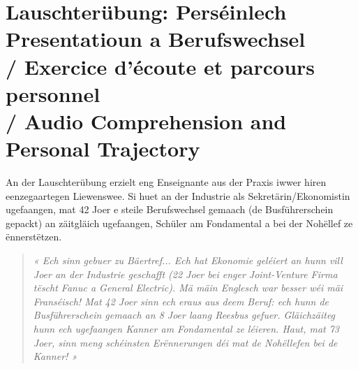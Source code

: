 \vspace{1.5em}

\section[Lauschterübung \& Presentatioun / Audio Comprehension \& Presentation]{Lauschterübung: Perséinlech Presentatioun a Berufswechsel \\/ Exercice d'écoute et parcours personnel \\/ Audio Comprehension and Personal Trajectory}

\noindent An der Lauschterübung erzielt eng Enseignante aus der Praxis iwwer hiren eenzegaartegen Liewenswee. Si huet an der Industrie als Sekretärin/Ekonomistin ugefaangen, mat 42 Joer e steile Berufswechsel gemaach (de Busführerschein gepackt) an zäitgläich ugefaangen, Schüler am Fondamental a bei der Nohëllef ze ënnerstëtzen.

\begin{quote}
\textit{« Ech sinn gebuer zu Bäertref... Ech hat Ekonomie geléiert an hunn vill Joer an der Industrie geschafft (22 Joer bei enger Joint-Venture Firma tëscht Fanuc a General Electric). Mä mäin Englesch war besser wéi mäi Franséisch! Mat 42 Joer sinn ech eraus aus deem Beruf: ech hunn de Busführerschein gemaach an 8 Joer laang Reesbus gefuer. Gläichzäiteg hunn ech ugefaangen Kanner am Fondamental ze léieren. Haut, mat 73 Joer, sinn meng schéinsten Erënnerungen déi mat de Nohëllefen bei de Kanner! »}
\end{quote}

